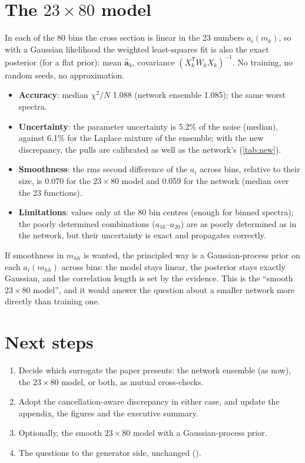 \section{The $23\times80$ model}

In each of the 80 bins the cross section is linear in the 23 numbers $a_i(m_k)$, so with a
Gaussian likelihood the weighted least-squares fit is also the exact posterior (for a flat
prior): mean $\hat{\boldsymbol a}_k$, covariance $(X_k^{\mathsf T}W_kX_k)^{-1}$. No training,
no random seeds, no approximation.

\begin{itemize}
  \item \textbf{Accuracy}: median $\chi^2/N$ 1.088 (network ensemble 1.085); the same worst
    spectra.
  \item \textbf{Uncertainty}: the parameter uncertainty is 5.2\% of the noise (median),
    against 6.1\% for the Laplace mixture of the ensemble; with the new discrepancy, the
    pulls are calibrated as well as the network's (\cref{tab:new}).
  \item \textbf{Smoothness}: the rms second difference of the $a_i$ across bins, relative to
    their size, is 0.070 for the $23\times80$ model and 0.059 for the network (median over
    the 23 functions).
  \item \textbf{Limitations}: values only at the 80 bin centres (enough for binned spectra);
    the poorly determined combinations ($a_{16}$--$a_{20}$) are as poorly determined as in the
    network, but their uncertainty is exact and propagates correctly.
\end{itemize}

\begin{keyidea}
If smoothness in $m_{hh}$ is wanted, the principled way is a Gaussian-process prior on each
$a_i(m_{hh})$ across bins: the model stays linear, the posterior stays exactly Gaussian, and
the correlation length is set by the evidence. This is the ``smooth $23\times80$ model'', and
it would answer the question about a smaller network more directly than training one.
\end{keyidea}

\section{Next steps}

\begin{enumerate}
  \item Decide which surrogate the paper presents: the network ensemble (as now), the
    $23\times80$ model, or both, as mutual cross-checks.
  \item Adopt the cancellation-aware discrepancy in either case, and update the appendix,
    the figures and the executive summary.
  \item Optionally, the smooth $23\times80$ model with a Gaussian-process prior.
  \item The questions to the generator side, unchanged ().
\end{enumerate}


